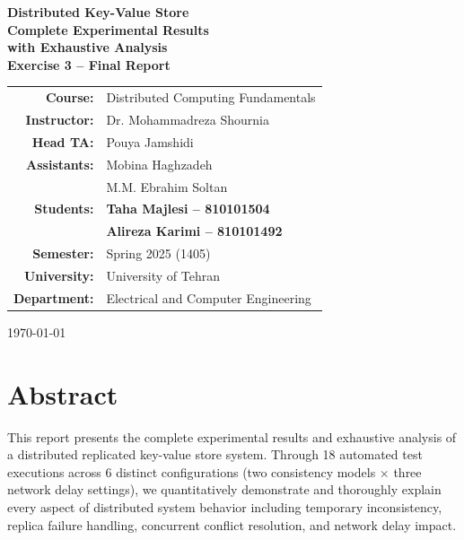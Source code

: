 \documentclass[10pt,a4paper]{article}
\begin{document}
\begin{titlepage}
\centering
\vspace*{2cm}
{\Huge \bfseries Distributed Key-Value Store\\[0.5cm]}
{\LARGE \bfseries Complete Experimental Results\\[0.3cm] with Exhaustive Analysis\\[1.5cm]}
{\Large \bfseries Exercise 3 -- Final Report}\\[1.5cm]

{\large
\begin{tabular}{rl}
\textbf{Course:} & Distributed Computing Fundamentals \\
\textbf{Instructor:} & Dr. Mohammadreza Shournia \\
\textbf{Head TA:} & Pouya Jamshidi \\
\textbf{Assistants:} & Mobina Haghzadeh \\
& M.M. Ebrahim Soltan \\[0.8cm]
\textbf{Students:} & \textbf{Taha Majlesi -- 810101504} \\
& \textbf{Alireza Karimi -- 810101492} \\[0.8cm]
\textbf{Semester:} & Spring 2025 (1405) \\
\textbf{University:} & University of Tehran \\
\textbf{Department:} & Electrical and Computer Engineering \\[2cm]
\end{tabular}
}

\vfill

{\large \today}

\end{titlepage}



\newpage
\tableofcontents
\newpage

\section{Abstract}

This report presents the complete experimental results and exhaustive analysis of a distributed replicated key-value store system. Through 18 automated test executions across 6 distinct configurations (two consistency models $\times$ three network delay settings), we quantitatively demonstrate and thoroughly explain every aspect of distributed system behavior including temporary inconsistency, replica failure handling, concurrent conflict resolution, and network delay impact.
\end{document}
